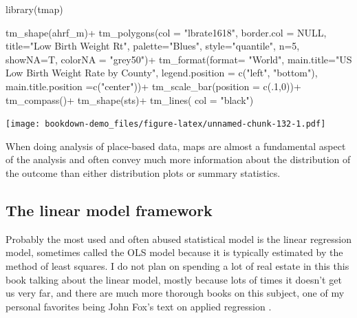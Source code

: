 \documentclass[
]{article}
\newenvironment{Shaded}{\begin{snugshade}}{\end{snugshade}}
\newcommand{\AttributeTok}[1]{\textcolor[rgb]{0.77,0.63,0.00}{#1}}
\newcommand{\ConstantTok}[1]{\textcolor[rgb]{0.00,0.00,0.00}{#1}}
\newcommand{\DecValTok}[1]{\textcolor[rgb]{0.00,0.00,0.81}{#1}}
\newcommand{\FunctionTok}[1]{\textcolor[rgb]{0.00,0.00,0.00}{#1}}
\newcommand{\NormalTok}[1]{#1}
\newcommand{\SpecialCharTok}[1]{\textcolor[rgb]{0.00,0.00,0.00}{#1}}
\newcommand{\StringTok}[1]{\textcolor[rgb]{0.31,0.60,0.02}{#1}}
\begin{document}
\begin{Shaded}
\begin{Highlighting}[]
\FunctionTok{library}\NormalTok{(tmap)}

\FunctionTok{tm\_shape}\NormalTok{(ahrf\_m)}\SpecialCharTok{+}
  \FunctionTok{tm\_polygons}\NormalTok{(}\AttributeTok{col =} \StringTok{"lbrate1618"}\NormalTok{,}
              \AttributeTok{border.col =} \ConstantTok{NULL}\NormalTok{,}
              \AttributeTok{title=}\StringTok{"Low Birth Weight Rt"}\NormalTok{,}
              \AttributeTok{palette=}\StringTok{"Blues"}\NormalTok{,}
              \AttributeTok{style=}\StringTok{"quantile"}\NormalTok{,}
              \AttributeTok{n=}\DecValTok{5}\NormalTok{,}
              \AttributeTok{showNA=}\NormalTok{T, }\AttributeTok{colorNA =} \StringTok{"grey50"}\NormalTok{)}\SpecialCharTok{+}
   \FunctionTok{tm\_format}\NormalTok{(}\AttributeTok{format=} \StringTok{"World"}\NormalTok{,}
             \AttributeTok{main.title=}\StringTok{"US Low Birth Weight Rate by County"}\NormalTok{,}
            \AttributeTok{legend.position =}  \FunctionTok{c}\NormalTok{(}\StringTok{"left"}\NormalTok{, }\StringTok{"bottom"}\NormalTok{),}
            \AttributeTok{main.title.position =}\FunctionTok{c}\NormalTok{(}\StringTok{"center"}\NormalTok{))}\SpecialCharTok{+}
  \FunctionTok{tm\_scale\_bar}\NormalTok{(}\AttributeTok{position =} \FunctionTok{c}\NormalTok{(.}\DecValTok{1}\NormalTok{,}\DecValTok{0}\NormalTok{))}\SpecialCharTok{+}
  \FunctionTok{tm\_compass}\NormalTok{()}\SpecialCharTok{+}
\FunctionTok{tm\_shape}\NormalTok{(sts)}\SpecialCharTok{+}
  \FunctionTok{tm\_lines}\NormalTok{( }\AttributeTok{col =} \StringTok{"black"}\NormalTok{)}
\end{Highlighting}
\end{Shaded}

\texttt{[image: bookdown-demo\_files/figure-latex/unnamed-chunk-132-1.pdf]}

When doing analysis of place-based data, maps are almost a fundamental aspect of the analysis and often convey much more information about the distribution of the outcome than either distribution plots or summary statistics.

\hypertarget{the-linear-model-framework}{%
\subsection{The linear model framework}\label{the-linear-model-framework}}

Probably the most used and often abused statistical model is the linear regression model, sometimes called the OLS model because it is typically estimated by the method of least squares. I do not plan on spending a lot of real estate in this this book talking about the linear model, mostly because lots of times it doesn't get us very far, and there are much more thorough books on this subject, one of my personal favorites being John Fox's text on applied regression \citep{fox_applied_2016}.
\end{document}
